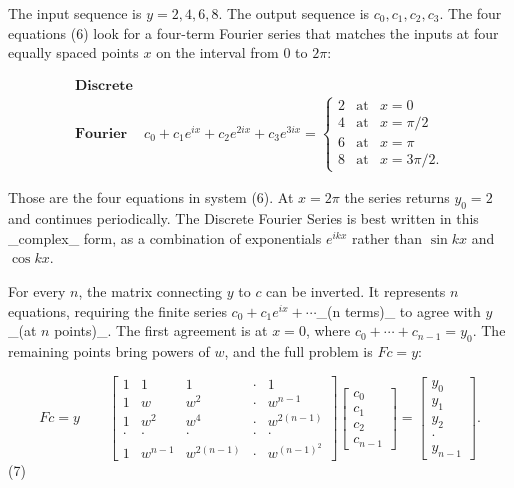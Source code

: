 The input sequence is \(y=2,4,6,8\). The output sequence is \(c_{0},c_{1},c_{2},c_{3}\). The four equations (6) look for a four-term Fourier series that matches the inputs at four equally spaced points \(x\) on the interval from \(0\) to \(2\pi\):

\[\begin{array}{ll}\textbf{Discrete}&\\ \textbf{Fourier}&c_{0}+c_{1}e^{ix}+c_{2}e^{2ix}+c_{3}e^{3ix}=\begin{cases}2& \text{at}&x=0\\ 4&\text{at}&x=\pi/2\\ 6&\text{at}&x=\pi\\ 8&\text{at}&x=3\pi/2.\end{cases}\end{array}\]

Those are the four equations in system (6). At \(x=2\pi\) the series returns \(y_{0}=2\) and continues periodically. The Discrete Fourier Series is best written in this _complex_ form, as a combination of exponentials \(e^{ikx}\) rather than \(\sin kx\) and \(\cos kx\).

For every \(n\), the matrix connecting \(y\) to \(c\) can be inverted. It represents \(n\) equations, requiring the finite series \(c_{0}+c_{1}e^{ix}+\cdots\)_(n terms)_ to agree with \(y\)_(at \(n\) points)_. The first agreement is at \(x=0\), where \(c_{0}+\cdots+c_{n-1}=y_{0}\). The remaining points bring powers of \(w\), and the full problem is \(Fc=y\):

\[Fc=y\qquad\begin{bmatrix}1&1&1&\cdot&1\\ 1&w&w^{2}&\cdot&w^{n-1}\\ 1&w^{2}&w^{4}&\cdot&w^{2(n-1)}\\ \cdot&\cdot&\cdot&\cdot&\cdot\\ 1&w^{n-1}&w^{2(n-1)}&\cdot&w^{(n-1)^{2}}\end{bmatrix}\begin{bmatrix}c_{0}\\ c_{1}\\ c_{2}\\ c_{n-1}\end{bmatrix}=\begin{bmatrix}y_{0}\\ y_{1}\\ y_{2}\\ \cdot\\ y_{n-1}\end{bmatrix}.\] (7)

